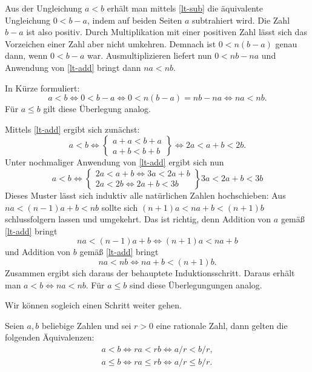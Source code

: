 \noindent{}
Aus der Ungleichung $a<b$ erhält man mittels \eqref{lt-sub} die
äquivalente Ungleichung $0<b-a$, indem auf beiden Seiten $a$
subtrahiert wird. Die Zahl $b-a$ ist also positiv. Durch Multiplikation
mit einer positiven Zahl lässt sich das Vorzeichen einer Zahl
aber nicht umkehren. Demnach ist $0<n(b-a)$ genau dann,
wenn $0<b-a$ war. Ausmultiplizieren liefert nun
$0<nb-na$ und Anwendung von \eqref{lt-add} bringt dann $na<nb$.

In Kürze formuliert:
\begin{equation}
a<b\iff 0<b-a\iff 0<n(b-a)=nb-na \iff na<nb.
\end{equation}
Für $a\le b$ gilt diese Überlegung analog.\;\qedsymbol

Mittels \eqref{lt-add} ergibt sich zunächst:
\begin{equation}
a<b\iff \left\{
\begin{matrix}
a+a<b+a\\
a+b<b+b
\end{matrix}
\right\}
\iff 2a<a+b<2b.
\end{equation}
Unter nochmaliger Anwendung von \eqref{lt-add} ergibt sich
nun
\begin{equation}
a<b\iff \left\{
\begin{matrix}
2a<a+b \iff 3a<2a+b\\
2a<2b \iff 2a+b<3b
\end{matrix}
\right\} 3a<2a+b<3b
\end{equation}
Dieses Muster lässt sich induktiv alle natürlichen Zahlen hochschieben:
Aus $na<(n-1)a+b<nb$ sollte sich
$(n+1)a<na+b<(n+1)b$ schlussfolgern lassen und umgekehrt.
Das ist richtig, denn Addition von $a$ gemäß \eqref{lt-add} bringt
\begin{equation}
na<(n-1)a+b \iff (n+1)a < na+b
\end{equation}
und Addition von $b$ gemäß \eqref{lt-add} bringt
\begin{equation}
na<nb \iff na+b < (n+1)b.
\end{equation}
Zusammen ergibt sich daraus der behauptete Induktionsschritt. 
Daraus erhält man $a<b\iff na<nb$. Für $a\le b$ sind diese
Überlegungungen analog.\;\qedsymbol

Wir können sogleich einen Schritt weiter gehen.
\begin{Satz}
Seien $a,b$ beliebige Zahlen und sei $r>0$ eine rationale Zahl,
dann gelten die folgenden Äquivalenzen:
\begin{gather}
\label{lt-mul-rat} a<b\iff ra<rb\iff a/r<b/r,\\
\label{lt-mul-rat} a\le b\iff ra\le rb\iff a/r\le b/r.
\end{gather}
\end{Satz}

